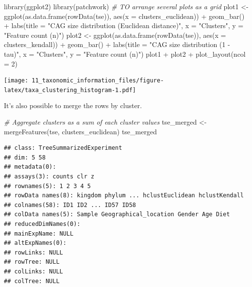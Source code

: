 \documentclass[
]{book}
\newenvironment{Shaded}{\begin{snugshade}}{\end{snugshade}}
\newcommand{\AttributeTok}[1]{\textcolor[rgb]{0.77,0.63,0.00}{#1}}
\newcommand{\CommentTok}[1]{\textcolor[rgb]{0.56,0.35,0.01}{\textit{#1}}}
\newcommand{\DecValTok}[1]{\textcolor[rgb]{0.00,0.00,0.81}{#1}}
\newcommand{\FunctionTok}[1]{\textcolor[rgb]{0.00,0.00,0.00}{#1}}
\newcommand{\NormalTok}[1]{#1}
\newcommand{\OtherTok}[1]{\textcolor[rgb]{0.56,0.35,0.01}{#1}}
\newcommand{\SpecialCharTok}[1]{\textcolor[rgb]{0.00,0.00,0.00}{#1}}
\newcommand{\StringTok}[1]{\textcolor[rgb]{0.31,0.60,0.02}{#1}}
\begin{document}
\begin{Shaded}
\begin{Highlighting}[]
\FunctionTok{library}\NormalTok{(ggplot2)}
\FunctionTok{library}\NormalTok{(patchwork) }\CommentTok{\# TO arrange several plots as a grid}
\NormalTok{plot1 }\OtherTok{\textless{}{-}} \FunctionTok{ggplot}\NormalTok{(}\FunctionTok{as.data.frame}\NormalTok{(}\FunctionTok{rowData}\NormalTok{(tse)), }\FunctionTok{aes}\NormalTok{(}\AttributeTok{x =}\NormalTok{ clusters\_euclidean)) }\SpecialCharTok{+}
    \FunctionTok{geom\_bar}\NormalTok{() }\SpecialCharTok{+}
    \FunctionTok{labs}\NormalTok{(}\AttributeTok{title =} \StringTok{"CAG size distribution (Euclidean distance)"}\NormalTok{,}
         \AttributeTok{x =} \StringTok{"Clusters"}\NormalTok{, }\AttributeTok{y =} \StringTok{"Feature count (n)"}\NormalTok{)}
\NormalTok{plot2 }\OtherTok{\textless{}{-}} \FunctionTok{ggplot}\NormalTok{(}\FunctionTok{as.data.frame}\NormalTok{(}\FunctionTok{rowData}\NormalTok{(tse)), }\FunctionTok{aes}\NormalTok{(}\AttributeTok{x =}\NormalTok{ clusters\_kendall)) }\SpecialCharTok{+}
    \FunctionTok{geom\_bar}\NormalTok{() }\SpecialCharTok{+}
    \FunctionTok{labs}\NormalTok{(}\AttributeTok{title =} \StringTok{"CAG size distribution (1 {-} tau)"}\NormalTok{,}
         \AttributeTok{x =} \StringTok{"Clusters"}\NormalTok{, }\AttributeTok{y =} \StringTok{"Feature count (n)"}\NormalTok{)}
\NormalTok{plot1 }\SpecialCharTok{+}\NormalTok{ plot2 }\SpecialCharTok{+} \FunctionTok{plot\_layout}\NormalTok{(}\AttributeTok{ncol =} \DecValTok{2}\NormalTok{)}
\end{Highlighting}
\end{Shaded}

\texttt{[image: 11\_taxonomic\_information\_files/figure-latex/taxa\_clustering\_histogram-1.pdf]}

It's also possible to merge the rows by cluster.

\begin{Shaded}
\begin{Highlighting}[]
\CommentTok{\# Aggregate clusters as a sum of each cluster values}
\NormalTok{tse\_merged }\OtherTok{\textless{}{-}} \FunctionTok{mergeFeatures}\NormalTok{(tse, clusters\_euclidean)}
\NormalTok{tse\_merged}
\end{Highlighting}
\end{Shaded}

\begin{verbatim}
## class: TreeSummarizedExperiment 
## dim: 5 58 
## metadata(0):
## assays(3): counts clr z
## rownames(5): 1 2 3 4 5
## rowData names(8): kingdom phylum ... hclustEuclidean hclustKendall
## colnames(58): ID1 ID2 ... ID57 ID58
## colData names(5): Sample Geographical_location Gender Age Diet
## reducedDimNames(0):
## mainExpName: NULL
## altExpNames(0):
## rowLinks: NULL
## rowTree: NULL
## colLinks: NULL
## colTree: NULL
\end{verbatim}
\end{document}
